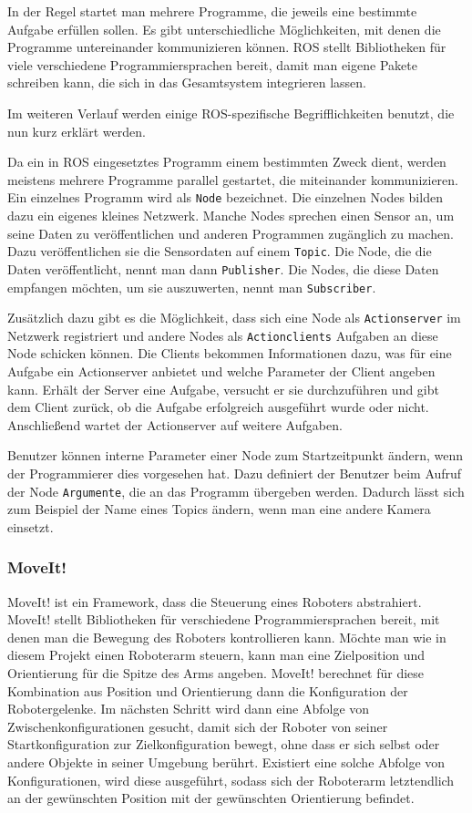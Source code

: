 In der Regel startet man mehrere Programme, die jeweils eine bestimmte Aufgabe erfüllen sollen. Es gibt unterschiedliche Möglichkeiten, mit denen die Programme untereinander kommunizieren können. ROS stellt Bibliotheken für viele verschiedene Programmiersprachen bereit, damit man eigene Pakete schreiben kann, die sich in das Gesamtsystem integrieren lassen.

Im weiteren Verlauf werden einige ROS-spezifische Begrifflichkeiten benutzt, die nun kurz erklärt werden.

Da ein in ROS eingesetztes Programm einem bestimmten Zweck dient, werden meistens mehrere Programme parallel gestartet, die miteinander kommunizieren. Ein einzelnes Programm wird als \texttt{Node} bezeichnet. Die einzelnen Nodes bilden dazu ein eigenes kleines Netzwerk. Manche Nodes sprechen einen Sensor an, um seine Daten zu veröffentlichen und anderen Programmen zugänglich zu machen. Dazu veröffentlichen sie die Sensordaten auf einem \texttt{Topic}. Die Node, die die Daten veröffentlicht, nennt man dann \texttt{Publisher}. Die Nodes, die diese Daten empfangen möchten, um sie auszuwerten, nennt man \texttt{Subscriber}. 

Zusätzlich dazu gibt es die Möglichkeit, dass sich eine Node als \texttt{Actionserver} im Netzwerk registriert und andere Nodes als \texttt{Actionclients} Aufgaben an diese Node schicken können. Die Clients bekommen Informationen dazu, was für eine Aufgabe ein Actionserver anbietet und welche Parameter der Client angeben kann. Erhält der Server eine Aufgabe, versucht er sie durchzuführen und gibt dem Client zurück, ob die Aufgabe erfolgreich ausgeführt wurde oder nicht. Anschließend wartet der Actionserver auf weitere Aufgaben.

Benutzer können interne Parameter einer Node zum Startzeitpunkt ändern, wenn der Programmierer dies vorgesehen hat. Dazu definiert der Benutzer beim Aufruf der Node \texttt{Argumente}, die an das Programm übergeben werden. Dadurch lässt sich zum Beispiel der Name eines Topics ändern, wenn man eine andere Kamera einsetzt. 

\subsubsection{MoveIt!} %
\label{ssub:moveit}
MoveIt! \cite{MoveIt} ist ein Framework, dass die Steuerung eines Roboters abstrahiert. MoveIt! stellt Bibliotheken für verschiedene Programmiersprachen bereit, mit denen man die Bewegung des Roboters kontrollieren kann. Möchte man wie in diesem Projekt einen Roboterarm steuern, kann man eine Zielposition und Orientierung für die Spitze des Arms angeben. MoveIt! berechnet für diese Kombination aus Position und Orientierung dann die Konfiguration der Robotergelenke. Im nächsten Schritt wird dann eine Abfolge von Zwischenkonfigurationen gesucht, damit sich der Roboter von seiner Startkonfiguration zur Zielkonfiguration bewegt, ohne dass er sich selbst oder andere Objekte in seiner Umgebung berührt. Existiert eine solche Abfolge von Konfigurationen, wird diese ausgeführt, sodass sich der Roboterarm letztendlich an der gewünschten Position mit der gewünschten Orientierung befindet.

